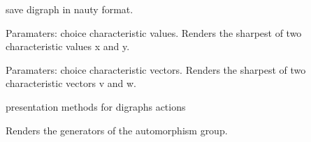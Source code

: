 \documentclass[letterpaper,10pt,english]{sphinxmanual}
\begin{document}
\begin{fulllineitems}

\begin{fulllineitems}
\label{techDoc:digraphs.Digraph.savedre}
save digraph in nauty format.

\end{fulllineitems}


\begin{fulllineitems}
\label{techDoc:digraphs.Digraph.sharp}
Paramaters: choice characteristic values.
Renders the sharpest of two characteristic values x and y.

\end{fulllineitems}


\begin{fulllineitems}
\label{techDoc:digraphs.Digraph.sharpvec}
Paramaters: choice characteristic vectors.
Renders the sharpest of two characteristic vectors v and w.

\end{fulllineitems}


\begin{fulllineitems}
\label{techDoc:digraphs.Digraph.showActions}
presentation methods for digraphs actions

\end{fulllineitems}


\begin{fulllineitems}
\label{techDoc:digraphs.Digraph.showAll}
\end{fulllineitems}


\begin{fulllineitems}
\label{techDoc:digraphs.Digraph.showAutomorphismGenerators}
Renders the generators of the automorphism group.


\end{fulllineitems}
\end{fulllineitems}
\end{document}
